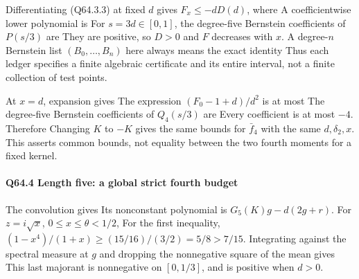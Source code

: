 Differentiating (Q64.3.3) at fixed \(d\) gives \(F_x\le-dD(d)\), where
A coefficientwise lower polynomial is
For \(s=3d\in[0,\allowbreak  1]\), the degree-five Bernstein coefficients of
\(P(s/3)\) are
They are positive, so \(D>0\) and \(F\) decreases with \(x\).
A degree-\(n\) Bernstein list \((B_0,\allowbreak  \ldots,\allowbreak  B_n)\) here always means
the exact identity
Thus each ledger specifies a finite algebraic certificate and its
entire interval, not a finite collection of test points.

At \(x=d\), expansion gives
The expression \((F_0-1+d)/d^2\) is at most
The degree-five Bernstein coefficients of \(Q_4(s/3)\) are
Every coefficient is at most \(-4\). Therefore
Changing \(K\) to \(-K\) gives the same bounds for \(\bar f_4\) with the
same \(d,\allowbreak  \delta_2,\allowbreak  x\). This asserts common bounds, not equality between
the two fourth moments for a fixed kernel.

\paragraph{Q64.4 Length five: a global strict fourth budget}

The convolution gives
Its nonconstant polynomial is \(G_5(K)g-d(2g+r)\).
For \(z=i\sqrt{x}\), \(0\le x\le\theta<1/2\),
For the first inequality,
\((1-x^4)/(1+x)\ge(15/16)/(3/2)=5/8>7/15\).
Integrating against the spectral measure at \(g\) and dropping the
nonnegative square of the mean gives
This last majorant is nonnegative on \([0,\allowbreak  1/3]\), and is positive
when \(d>0\).

